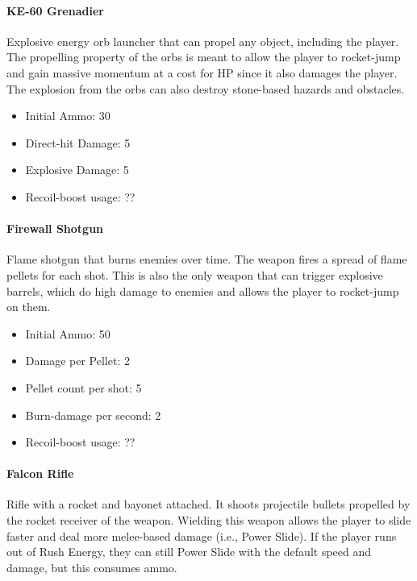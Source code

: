 \documentclass[12pt]{article}
\begin{document}
\paragraph{KE-60 Grenadier}

Explosive energy orb launcher that can propel any object, including the player. The propelling property of the orbs is meant to allow the player to rocket-jump and gain massive momentum at a cost for HP since it also damages the player. The explosion from the orbs can also destroy stone-based hazards and obstacles. 

\begin{itemize}
	\item Initial Ammo: 30
	\item Direct-hit Damage: 5
	\item Explosive Damage: 5
	\item Recoil-boost usage: ??
\end{itemize} 


\paragraph{Firewall Shotgun}

Flame shotgun that burns enemies over time. The weapon fires a spread of flame pellets for each shot. This is also the only weapon that can trigger explosive barrels, which do high damage to enemies and allows the player to rocket-jump on them. 

\begin{itemize}
	\item Initial Ammo: 50
	\item Damage per Pellet: 2
	\item Pellet count per shot: 5
	\item Burn-damage per second: 2
	\item Recoil-boost usage: ??
\end{itemize} 

\paragraph{Falcon Rifle}

Rifle with a rocket and bayonet attached. It shoots projectile bullets propelled by the rocket receiver of the weapon. Wielding this weapon allows the player to slide faster and deal more melee-based damage (i.e., Power Slide). If the player runs out of Rush Energy, they can still Power Slide with the default speed and damage, but this consumes ammo. 
\end{document}
